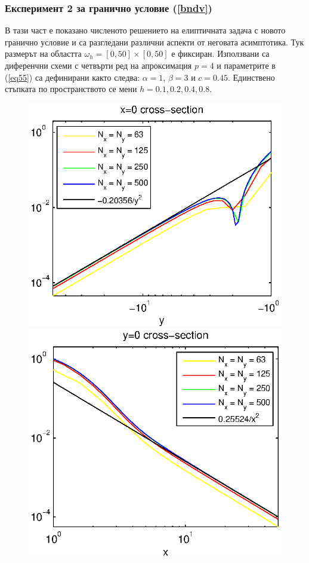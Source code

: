 \documentclass{article}
\newcommand{\rf}[1]{(\ref{#1})}
\theoremstyle{remark}
\begin{document}
\subsubsection{Експеримент 2 за гранично условие \rf{bndv}}
В тази част е показано численото решението на елиптичната задача с новото гранично условие и са разгледани различни аспекти от неговата асимптотика. Тук размерът на областта $\omega_h = [0, 50] \times [0, 50]$ е фиксиран. Използвани са диференчни схеми с четвърти ред на апроксимация $p=4$ и параметрите в \rf{eq55} са дефинирани както следва: $\alpha = 1$, $\beta = 3$ и $c=0.45$. Единствено стъпката по пространството се мени $h=0.1, 0.2, 0.4, 0.8$.
\begin{figure}[ht]
	\begin{minipage}[b]{0.5\linewidth}
		\raggedleft
		\includegraphics[width=\linewidth]{NewBoundaryCondition/crossSectionLogX=0.eps}
	\end{minipage}	
	\begin{minipage}[b]{0.5\linewidth}
		\raggedright
		 \includegraphics[width=\linewidth]{NewBoundaryCondition/crossSectionLogY=0.eps}

\end{minipage}
\end{figure}
\end{document}
